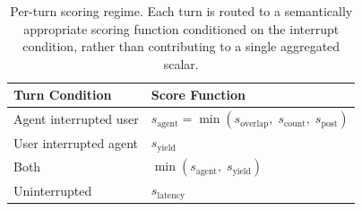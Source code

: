 \begin{table}[h]
\centering
\small
\captionsetup{font=small}
\caption{Per-turn scoring regime. Each turn is routed to a 
semantically appropriate scoring function conditioned on the 
interrupt condition, rather than contributing to a single 
aggregated scalar.}
\begin{tabular}{ll}
\toprule
\textbf{Turn Condition} & \textbf{Score Function} \\
\midrule
Agent interrupted user  & $s_{\text{agent}} = \min(s_{\text{overlap}},\; s_{\text{count}},\; s_{\text{post}})$ \\
User interrupted agent  & $s_{\text{yield}}$ \\
Both                    & $\min(s_{\text{agent}},\; s_{\text{yield}})$ \\
Uninterrupted                 & $s_{\text{latency}}$ \\
\bottomrule
\end{tabular}
\label{tab:tt-regime}
\end{table}